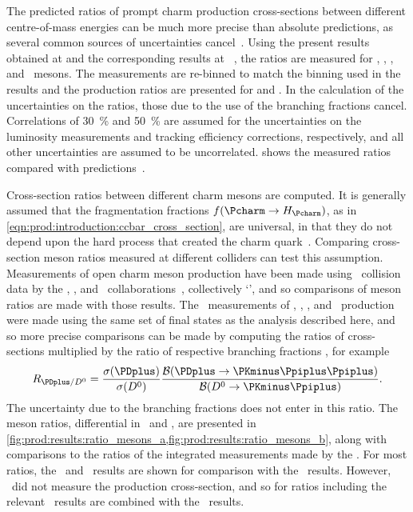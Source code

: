 The predicted ratios of prompt charm production cross-sections between 
different centre-of-mass energies can be much more precise than absolute 
predictions, as several common sources of uncertainties 
cancel~\cite{Gauld:2015yia,Cacciari:2015fta,Kniehl:2012ti}.
Using the present results obtained at  and the corresponding 
results at ~\cite{LHCb-PAPER-2012-041}, the ratios 
 are measured for \PDzero, \PDplus, \PDsplus, and \PDstarp\ 
mesons.
The  measurements are re-binned to match the binning used in the 
\sqrtseq{7} results and the production ratios are presented for \pTrange{0}{8} 
and \yrange{2}{4.5}.
In the calculation of the uncertainties on the ratios, those due to the use of 
the branching fractions cancel.
Correlations of \SI{30}{\percent} and \SI{50}{\percent} are assumed for the 
uncertainties on the luminosity measurements and tracking efficiency 
corrections, respectively, and all other uncertainties are assumed to be 
uncorrelated.
 shows the measured ratios compared with 
predictions~\cite{Gauld:2015yia,Cacciari:2015fta,Kniehl:2012ti}.

Cross-section ratios between different charm mesons are computed.
It is generally assumed that the fragmentation fractions $f(\cToHc)$, as in 
\cref{eqn:prod:introduction:ccbar_cross_section}, are universal, in that they 
do not depend upon the hard process that created the charm 
quark~\cite{PDG2008,Lisovyi:2015uqa}.
Comparing cross-section meson ratios measured at different colliders can test 
this assumption.
Measurements of open charm meson production have been made using \epem\ 
collision data by the \babar, \belle, and \cleo\ 
collaborations~\cite{Artuso:2004pj,Seuster:2005tr,Aubert:2002ue}, collectively 
`\bfactories', and so comparisons of meson ratios are made with those results.
The \bfactory\ measurements of \PDzero, \PDplus, \PDsplus, and \PDstarp\ 
production were made using the same set of final states as the analysis 
described here, and so more precise comparisons can be made by computing the 
ratios of cross-sections multiplied by the ratio of respective branching 
fractions \xsectimesbfrac, for example
\begin{equation*}
  \resultratio{\PDplus}{\PDzero} = \frac{%
    \xsec(\PDplus)
  }{%
    \xsec(\PDzero)
  }\frac{%
    \bfrac(\DpToKpipi)
  }{%
    \bfrac(\DzToKpi)
  }.
\end{equation*}
The uncertainty due to the branching fractions does not enter in this ratio.
The meson ratios, differential in \pT\ and \rapidity, are presented in 
\cref{fig:prod:results:ratio_mesons_a,fig:prod:results:ratio_mesons_b}, along 
with comparisons to the ratios of the integrated measurements made by the 
\bfactories.
For most ratios, the \belle\ and \cleo\ results are shown for comparison with 
the \lhcb\ results.
However, \cleo\ did not measure the \PDsplus production cross-section, and so 
for ratios including \PDsplus the relevant \cleo\ results are combined with the 
\babar\ \PDsplus results.

